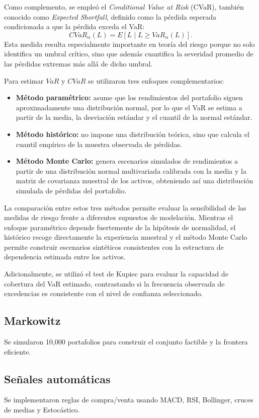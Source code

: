 \documentclass[11pt]{article}
\begin{document}
Como complemento, se empleó el \textit{Conditional Value at Risk} (CVaR), también conocido como \textit{Expected Shortfall}, definido como la pérdida esperada condicionada a que la pérdida exceda el VaR:
\[
CVaR_{\alpha}(L)=E[L \mid L \geq VaR_{\alpha}(L)].
\]
Esta medida resulta especialmente importante en teoría del riesgo porque no solo identifica un umbral crítico, sino que además cuantifica la severidad promedio de las pérdidas extremas más allá de dicho umbral.

Para estimar \(VaR\) y \(CVaR\) se utilizaron tres enfoques complementarios:
\begin{itemize}
    \item \textbf{Método paramétrico:} asume que los rendimientos del portafolio siguen aproximadamente una distribución normal, por lo que el VaR se estima a partir de la media, la desviación estándar y el cuantil de la normal estándar.
    \item \textbf{Método histórico:} no impone una distribución teórica, sino que calcula el cuantil empírico de la muestra observada de pérdidas.
    \item \textbf{Método Monte Carlo:} genera escenarios simulados de rendimientos a partir de una distribución normal multivariada calibrada con la media y la matriz de covarianza muestral de los activos, obteniendo así una distribución simulada de pérdidas del portafolio.
\end{itemize}

La comparación entre estos tres métodos permite evaluar la sensibilidad de las medidas de riesgo frente a diferentes supuestos de modelación. Mientras el enfoque paramétrico depende fuertemente de la hipótesis de normalidad, el histórico recoge directamente la experiencia muestral y el método Monte Carlo permite construir escenarios sintéticos consistentes con la estructura de dependencia estimada entre los activos.

Adicionalmente, se utilizó el test de Kupiec para evaluar la capacidad de cobertura del VaR estimado, contrastando si la frecuencia observada de excedencias es consistente con el nivel de confianza seleccionado.

\subsection{Markowitz}
Se simularon 10{,}000 portafolios para construir el conjunto factible y la frontera eficiente.

\subsection{Señales automáticas}
Se implementaron reglas de compra/venta usando MACD, RSI, Bollinger, cruces de medias y Estocástico.
\end{document}
